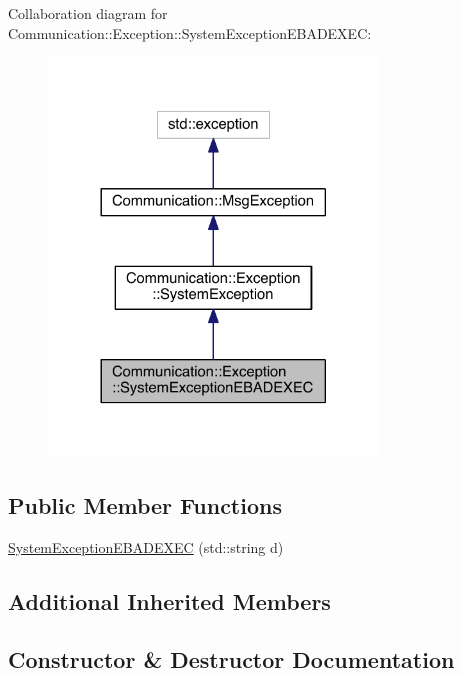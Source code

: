 Collaboration diagram for Communication\+:\+:Exception\+:\+:System\+Exception\+E\+B\+A\+D\+E\+X\+E\+C\+:\nopagebreak
\begin{figure}[H]
\begin{center}
\leavevmode
\includegraphics[width=248pt]{class_communication_1_1_exception_1_1_system_exception_e_b_a_d_e_x_e_c__coll__graph}
\end{center}
\end{figure}
\subsection*{Public Member Functions}
\begin{DoxyCompactItemize}
\item 
\hyperlink{class_communication_1_1_exception_1_1_system_exception_e_b_a_d_e_x_e_c_a296a40a3f855f251bae08f135da2999b}{System\+Exception\+E\+B\+A\+D\+E\+X\+E\+C} (std\+::string d)
\end{DoxyCompactItemize}
\subsection*{Additional Inherited Members}


\subsection{Constructor \& Destructor Documentation}
\hypertarget{class_communication_1_1_exception_1_1_system_exception_e_b_a_d_e_x_e_c_a296a40a3f855f251bae08f135da2999b}{}
